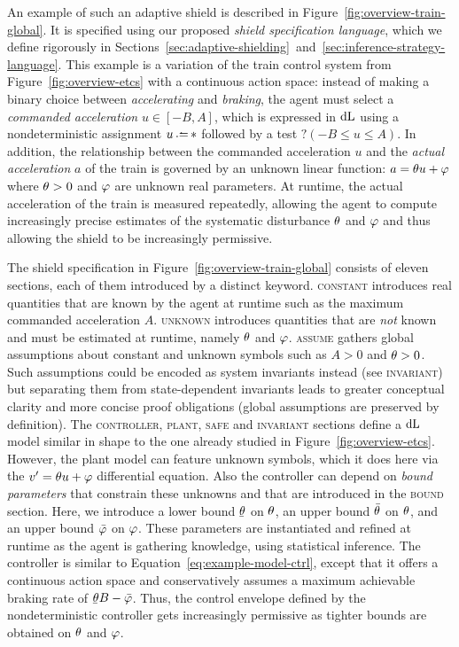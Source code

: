 \documentclass[acmsmall,screen,nonacm]{acmart}
\begin{document}
An example of such an adaptive shield is described in Figure~\ref{fig:overview-train-global}. It is specified using our proposed \emph{shield specification language}, which we define rigorously in Sections~\ref{sec:adaptive-shielding}~and~\ref{sec:inference-strategy-language}. This example is a variation of the train control system from Figure~\ref{fig:overview-etcs} with a continuous action space: instead of making a binary choice between \emph{accelerating} and \emph{braking}, the agent must select a \emph{commanded acceleration} $u \in [-B, A]$, which is expressed in $\mathop{}\!\mathrm{d} \text{L}$ using a nondeterministic assignment $u \dlassign *$ followed by a test $?(-B \!\le\! u \!\le\! A)$. In addition, the relationship between the commanded acceleration $u$ and the \emph{actual acceleration} $a$ of the train is governed by an unknown linear function: $a = \theta u + \varphi$ where $\theta > 0$ and $\varphi$ are unknown real parameters. At runtime, the actual acceleration of the train is measured repeatedly, allowing the agent to compute increasingly precise estimates of the systematic disturbance $\theta$ and $\varphi$ and thus allowing the shield to be increasingly permissive.

The shield specification in Figure~\ref{fig:overview-train-global} consists of eleven sections, each of them introduced by a distinct keyword. \textsc{constant} introduces real quantities that are known by the agent at runtime such as the maximum commanded acceleration $A$. \textsc{unknown} introduces quantities that are \emph{not} known and must be estimated at runtime, namely $\theta$ and $\varphi$. \textsc{assume} gathers global assumptions about constant and unknown symbols such as $A > 0$ and $\theta > 0$. Such assumptions could be encoded as system invariants instead (see \textsc{invariant}) but separating them from state-dependent invariants leads to greater conceptual clarity and more concise proof obligations (global assumptions are preserved by definition). The \textsc{controller}, \textsc{plant}, \textsc{safe} and \textsc{invariant} sections define a $\mathop{}\!\mathrm{d} \text{L}$ model similar in shape to the one already studied in Figure~\ref{fig:overview-etcs}. However, the plant model can feature unknown symbols, which it does here via the $v' = \theta u + \varphi$ differential equation. Also the controller can depend on \emph{bound parameters} that constrain these unknowns and that are introduced in the \textsc{bound} section. Here, we introduce a lower bound $\TrainThetaSlopeMin$ on $\theta$, an upper bound $\bar{\theta}$ on $\theta$, and an upper bound $\bar{\varphi}$ on $\varphi$. These parameters are instantiated and refined at runtime as the agent is gathering knowledge, using statistical inference. 
The controller is similar to Equation~\ref{eq:example-model-ctrl}, except that it offers a continuous action space and conservatively assumes a maximum achievable braking rate of $\TrainThetaBrakingRate$. Thus, the control envelope defined by the nondeterministic controller gets increasingly permissive as tighter bounds are obtained on $\theta$ and $\varphi$.
\end{document}
